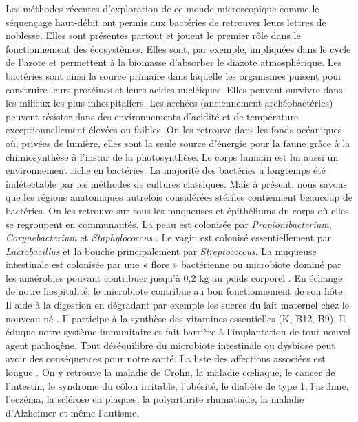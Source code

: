 \documentclass[12pt,a4paper]{article}
\begin{document}
Les méthodes récentes d'exploration de ce monde microscopique comme le séquençage haut-débit ont permis aux bactéries de retrouver leurs lettres de noblesse.
Elles sont présentes partout et jouent le premier rôle dans le fonctionnement des écosystèmes. Elles sont, par exemple, impliquées dans le cycle de l'azote et permettent à la biomasse d'absorber le diazote atmosphérique. Les bactéries sont ainsi la source primaire dans laquelle les organismes puisent pour construire leurs protéines et leurs acides nucléiques.
Elles peuvent survivre dans les milieux les plus inhospitaliers. Les archées (anciennement archéobactéries) peuvent résister dans des environnements d'acidité et de température exceptionnellement élevées ou faibles. On les retrouve dans les fonds océaniques où, privées de lumière, elles sont la seule source d'énergie pour la faune grâce à la chimiosynthèse à l'instar de la photosynthèse.
Le corps humain est lui aussi un environnement riche en bactéries. La majorité des bactéries a longtemps été indétectable par les méthodes de cultures classiques. Mais à présent, nous savons que les régions anatomiques autrefois considérées stériles contiennent beaucoup de bactéries.
On les retrouve sur tous les muqueuses et épithéliums du corps où elles se regroupent en communautés.
La peau est colonisée par \textit{Propionibacterium}, \textit{Corynebacterium} et \textit{Staphylococcus} \cite{Yong2017}. Le vagin est colonisé essentiellement par \textit{Lactobacillus} et la bouche principalement par \textit{Streptococcus}\cite{Yong2017}.
La muqueuse intestinale est colonisée par une « flore » bactérienne ou microbiote dominé par les anaérobies pouvant contribuer jusqu'à 0,2 kg au poids corporel \citep{Sender2016}.
En échange de notre hospitalité, le microbiote contribue au bon fonctionnement de son hôte. Il aide à la digestion en dégradant par exemple les sucres du lait maternel chez le nouveau-né \cite{Bode2012,Yong2017}. Il participe à la synthèse des vitamines essentielles (K, B12, B9)\cite{LeBlanc2013,Yong2017}. Il éduque notre système immunitaire et fait barrière à l'implantation de tout nouvel agent pathogène.
Tout déséquilibre du microbiote intestinale ou dysbiose peut avoir des conséquences pour notre santé. La liste des affections associées est longue \cite{Yong2017}. On y retrouve la maladie de Crohn, la maladie cœliaque, le cancer de l’intestin, le syndrome du côlon irritable, l’obésité, le diabète de type 1, l’asthme, l’eczéma, la sclérose en plaques, la polyarthrite rhumatoïde, la maladie d’Alzheimer et même l’autisme. \\
\end{document}
